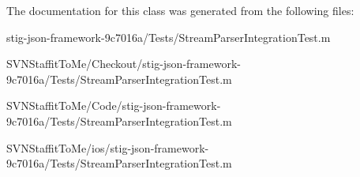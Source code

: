 \-The documentation for this class was generated from the following files\-:\begin{DoxyCompactItemize}
\item 
stig-\/json-\/framework-\/9c7016a/\-Tests/\-Stream\-Parser\-Integration\-Test.\-m\item 
\-S\-V\-N\-Staffit\-To\-Me/\-Checkout/stig-\/json-\/framework-\/9c7016a/\-Tests/\-Stream\-Parser\-Integration\-Test.\-m\item 
\-S\-V\-N\-Staffit\-To\-Me/\-Code/stig-\/json-\/framework-\/9c7016a/\-Tests/\-Stream\-Parser\-Integration\-Test.\-m\item 
\-S\-V\-N\-Staffit\-To\-Me/ios/stig-\/json-\/framework-\/9c7016a/\-Tests/\-Stream\-Parser\-Integration\-Test.\-m\end{DoxyCompactItemize}
